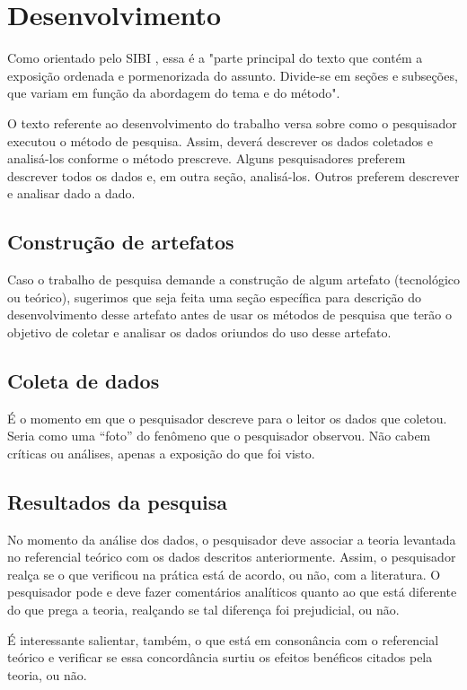 \chapter{Desenvolvimento}\label{cap:desenvolvimento}

Como orientado pelo SIBI \cite{ManualSibi2025}, essa é a "parte principal do texto que contém a exposição ordenada e pormenorizada do assunto. Divide-se em seções e subseções, que variam em função da abordagem do tema e do método".

O texto referente ao desenvolvimento do trabalho versa sobre como o pesquisador executou o método de pesquisa. Assim, deverá descrever os dados coletados e analisá-los conforme o método prescreve. Alguns pesquisadores preferem descrever todos os dados e, em outra seção, analisá-los. Outros preferem descrever e analisar dado a dado.

\section{Construção de artefatos}
Caso o trabalho de pesquisa demande a construção de algum artefato (tecnológico ou teórico), sugerimos que seja feita uma seção específica para descrição do desenvolvimento desse artefato antes de usar os métodos de pesquisa que terão o objetivo de coletar e analisar os dados oriundos do uso desse artefato.

\section{Coleta de dados}
É o momento em que o pesquisador descreve para o leitor os dados que coletou. Seria como uma “foto” do fenômeno que o pesquisador observou. Não cabem críticas ou análises, apenas a exposição do que foi visto.

\section{Resultados da pesquisa}
No momento da análise dos dados, o pesquisador deve associar a teoria levantada no referencial teórico com os dados descritos anteriormente. Assim, o pesquisador realça se o que verificou na prática está de acordo, ou não, com a literatura.  O pesquisador pode e deve fazer comentários analíticos quanto ao que está diferente do que prega a teoria, realçando se tal diferença foi prejudicial, ou não.

É interessante salientar, também, o que está em consonância com o referencial teórico e verificar se essa concordância surtiu os efeitos benéficos citados pela teoria, ou não.


